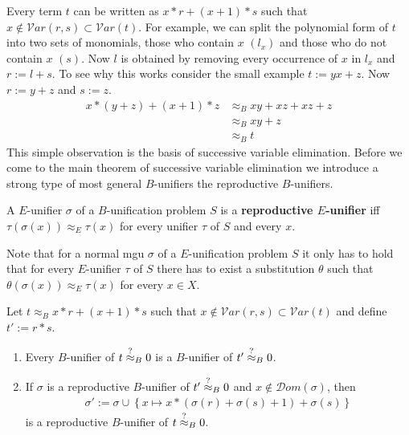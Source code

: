 		Every term $t$ can be written as $x*r+(x+1)*s$ such that $x\notin\mathcal{V}ar(r,s)\subset\mathcal{V}ar(t)$. For example, we can split the polynomial form of $t$ into two sets of monomials, those who contain $x$  $\left(l_x\right)$ and those who do not contain $x$ $(s)$. Now $l$ is obtained by removing every occurrence of $x$ in $l_x$ and $r:=l+s$. To see why this works consider the small example $t:=yx+z$. Now $r:=y+z$ and $s:=z$.
		\begin{align*}
		x*(y+z)+(x+1)*z&\approx_B xy+xz+xz+z\\
		&\approx_B xy+z\\
		&\approx_B t
		\end{align*}
		This simple observation is the basis of successive variable elimination.
		Before we come to the main theorem of successive variable elimination we introduce a strong type of most general $B$-unifiers the reproductive $B$-unifiers.
		\begin{definition}
		A $E$-unifier $\sigma$ of a $B$-unification problem $S$ is a \textbf{reproductive $E$-unifier} iff $\tau(\sigma(x))\approx_E\tau(x)$ for every unifier $\tau$ of $S$ and every $x$.
		\end{definition}
		Note that for a normal mgu $\sigma$ of a $E$-unification problem $S$ it only has to hold that for every $E$-unifier $\tau$ of $S$ there has to exist a substitution $\theta$ such that $\theta(\sigma(x))\approx_E\tau(x)$ for every $x\in X$. 
		\begin{theorem}
		Let $t\approx_B x*r+(x+1)*s$ such that $x\notin\mathcal{V}ar(r,s)\subset\mathcal{V}ar(t)$ and define $t':=r*s$.
		\begin{enumerate}
		\item Every $B$-unifier of $t\stackrel{?}{\approx}_B0$ is a $B$-unifier of $t'\stackrel{?}{\approx}_B0$.
		\item If $\sigma$ is a reproductive $B$-unifier of $t'\stackrel{?}{\approx}_B0$ and $x\notin\mathcal{D}om(\sigma)$, then 
		\begin{align*}
		\sigma':=\sigma\cup\left\lbrace x\mapsto x*(\sigma(r)+\sigma(s)+1)+\sigma(s)\right\rbrace
		\end{align*}
		is a reproductive $B$-unifier of $t\stackrel{?}{\approx}_B0$.
		\end{enumerate}
		\end{theorem}
